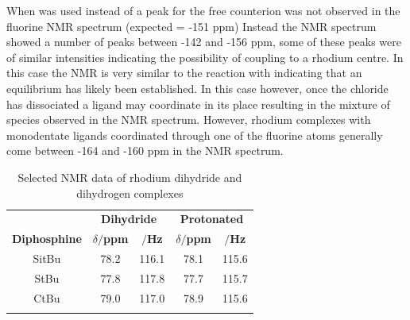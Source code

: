 When  was used instead of  a peak for the free  counterion was not observed in the fluorine NMR spectrum (expected = -151 ppm\cite{Feller2007})  Instead the \fluorine{} NMR spectrum showed a number of peaks between -142 and -156 ppm, some of these peaks were of similar intensities indicating the possibility of coupling to a rhodium centre.  In this case the \proton{} NMR is very similar to the reaction with  indicating that an equilibrium has likely been established.  In this case however, once the chloride has dissociated a  ligand may coordinate in its place resulting in the mixture of species observed in the \fluorine{} NMR spectrum.   However, rhodium complexes with monodentate  ligands coordinated through one of the fluorine atoms generally come between -164 and -160 ppm in the \fluorine{} NMR spectrum.\cite{Feller2007, Salem2006, Salem2008, Gandelman2003}



\begin{table}[htbp]
\caption[Selected NMR data of rhodium dihydride and dihydrogen complexes]{Selected NMR data of rhodium dihydride and dihydrogen complexes} 
\vspace{1em}
\label{table:dihydrogen}
\small
\begin{center}
\begin{tabular}{ c c c c c}
	\toprule{}
	~~ & \multicolumn{2}{c}{\bfseries{Dihydride}} & \multicolumn{2}{c}{\bfseries{Protonated}}\\
	\cmidrule(lr){2-3} \cmidrule(lr){4-5}
	\bfseries{Diphosphine}&\bfseries{$\delta$\phosphorus{}$/$ppm}&\bfseries{\JRhP$/$Hz}&\bfseries{$\delta$\phosphorus{}$/$ppm}&\bfseries{\JRhP$/$Hz}\\
	\midrule{}
	SitBu	&	78.2	&	116.1	&	78.1		&	115.6\\
	StBu		& 	77.8	&	117.8	&	77.7		&	115.7\\
	CtBu		&	79.0	&	117.0	&	78.9		&	115.6\\
	\bottomrule{}
\end{tabular}
\end{center}
\end{table}

